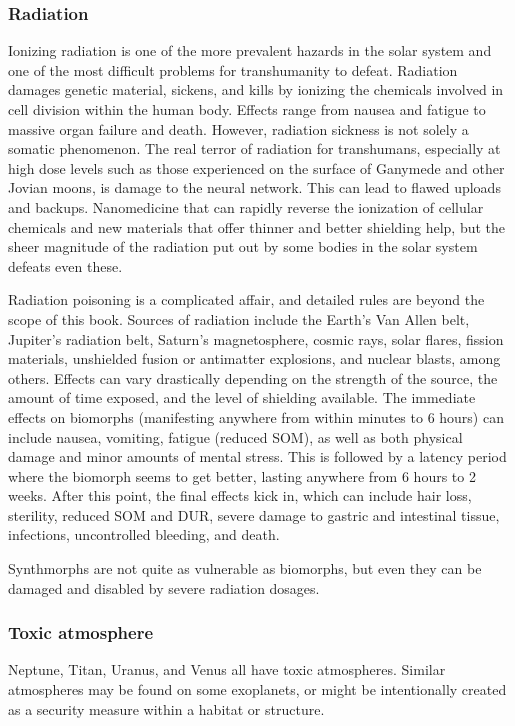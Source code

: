 \subsubsection{Radiation}

Ionizing radiation is one of the more prevalent hazards in the solar system and one of the most difficult problems for transhumanity to defeat. Radiation damages genetic material, sickens, and kills by ionizing the chemicals involved in cell division within the human body. Effects range from nausea and fatigue to massive organ failure and death. However, radiation sickness is not solely a somatic phenomenon. The real terror of radiation for transhumans, especially at high dose levels such as those experienced on the surface of Ganymede and other Jovian moons, is damage to the neural network. This can lead to flawed uploads and backups. Nanomedicine that can rapidly reverse the ionization of cellular chemicals and new materials that offer thinner and better shielding help, but the sheer magnitude of the radiation put out by some bodies in the solar system defeats even these.

Radiation poisoning is a complicated affair, and detailed rules are beyond the scope of this book. Sources of radiation include the Earth’s Van Allen belt, Jupiter’s radiation belt, Saturn’s magnetosphere, cosmic rays, solar flares, fission materials, unshielded fusion or antimatter explosions, and nuclear blasts, among others. Effects can vary drastically depending on the strength of the source, the amount of time exposed, and the level of shielding available. The immediate effects on biomorphs (manifesting anywhere from within minutes to 6 hours) can include nausea, vomiting, fatigue (reduced SOM), as well as both physical damage and minor amounts of mental stress. This is followed by a latency period where the biomorph seems to get better, lasting anywhere from 6 hours to 2 weeks. After this point, the final effects kick in, which can include hair loss, sterility, reduced SOM and DUR, severe damage to gastric and intestinal tissue, infections, uncontrolled bleeding, and death.

Synthmorphs are not quite as vulnerable as biomorphs, but even they can be damaged and disabled by severe radiation dosages.

\subsubsection{Toxic atmosphere}

Neptune, Titan, Uranus, and Venus all have toxic atmospheres. Similar atmospheres may be found on some exoplanets, or might be intentionally created as a security measure within a habitat or structure.

